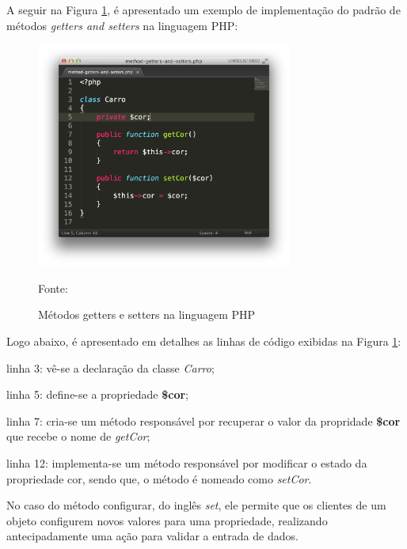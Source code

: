 A seguir na Figura \ref{fig:methodGettersAndSetters}, é apresentado um exemplo
de implementação do padrão de métodos \textit{getters and setters} na
linguagem \acs{PHP}:

\begin{figure}[h!tb]
	\caption{Métodos getters e setters na linguagem PHP}
	\label{fig:methodGettersAndSetters}

	\centering
	\includegraphics[width=0.75\textwidth]{images/method-getters-and-setters.png}

	\centering
	\footnotesize Fonte: \fonteOAutor
\end{figure}

\FloatBarrier 	%

Logo abaixo, é apresentado em detalhes as linhas de código exibidas na Figura
\ref{fig:methodGettersAndSetters}:

\begin{alineas}
    \item linha 3: vê-se a declaração da classe \textit{Carro};
    \item linha 5: define-se a propriedade \textbf{\$cor};
    \item linha 7: cria-se um método responsável por recuperar o valor da
    propridade \textbf{\$cor} que recebe o nome de \textit{getCor};
    \item linha 12: implementa-se um método responsável por modificar o estado
    da propriedade cor, sendo que, o método é nomeado como \textit{setCor}.
\end{alineas}

No caso do método configurar, do inglês \textit{set}, ele permite que os
clientes de um objeto configurem novos valores para uma propriedade, realizando
antecipadamente uma ação para validar a entrada de dados.

